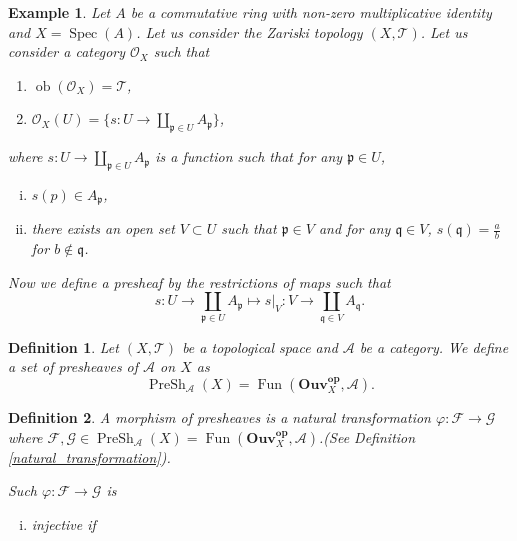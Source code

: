 \documentclass{article}
\newtheorem{definition}{Definition}[section]
\newtheorem{example}{Example}[section]
\numberwithin{equation}{section}
\DeclareMathOperator{\ob}{ob}
\DeclareMathOperator{\Spec}{Spec}
\DeclareMathOperator{\PreSh}{PreSh}
\DeclareMathOperator{\Fun}{Fun}
\begin{document}
\begin{example}
\label{structure_sheaf_ring}
Let $A$ be a commutative ring with non-zero multiplicative identity and $X=\Spec(A)$. Let us consider the Zariski topology $(X,\mathcal{T})$. Let us consider a category $\mathcal{O}_X$ such that
\begin{enumerate}[\textbullet]
\item $\ob(\mathcal{O}_X) = \mathcal{T}$,
\item $\mathcal{O}_X(U) =  \{s:U\to\coprod_{\mathfrak{p}\in U}A_{\mathfrak{p}}\}$,
\end{enumerate}
where $s:U\to\coprod_{\mathfrak{p}\in U}A_{\mathfrak{p}}$ is a function such that for any $\mathfrak{p}\in U$,
\begin{enumerate}[i).]
\item $s(p)\in A_{\mathfrak{p}}$,
\item there exists an open set $V\subset U$ such that $\mathfrak{p}\in V$ and for any $\mathfrak{q}\in V$,  $s(\mathfrak{q})={\frac a b}$ for $b\not\in\mathfrak{q}$. 
\end{enumerate}
Now we define a presheaf by the restrictions of maps such that
\begin{equation*}
s:U\to\coprod_{\mathfrak{p}\in U}A_{\mathfrak{p}} \mapsto s|_V:V\to\coprod_{\mathfrak{q}\in V} A_{\mathfrak{q}}.
\end{equation*}
\end{example}

\begin{definition}
Let $(X,\mathcal{T})$ be a topological space and $\mathcal{A}$ be a category. We define a set of presheaves of $\mathcal{A}$ on $X$ as
\begin{equation*}
\PreSh_{\mathcal{A}}(X)=\Fun(\mathbf{Ouv}_X^{\mathbf{op}},\mathcal{A}).
\end{equation*}
\end{definition}

\begin{definition}
A morphism of presheaves is a natural transformation $\varphi:\mathcal{F}\to \mathcal{G}$ where $\mathcal{F},\mathcal{G}\in\PreSh_\mathcal{A}(X)=\Fun(\mathbf{Ouv}_X^{\mathbf{op}},\mathcal{A})$.(See Definition \ref{natural_transformation}).\\
\par Such $\varphi:\mathcal{F}\to\mathcal{G}$ is 
\begin{enumerate}[i).]
\item injective if 
\end{enumerate}
\end{definition}
\end{document}

